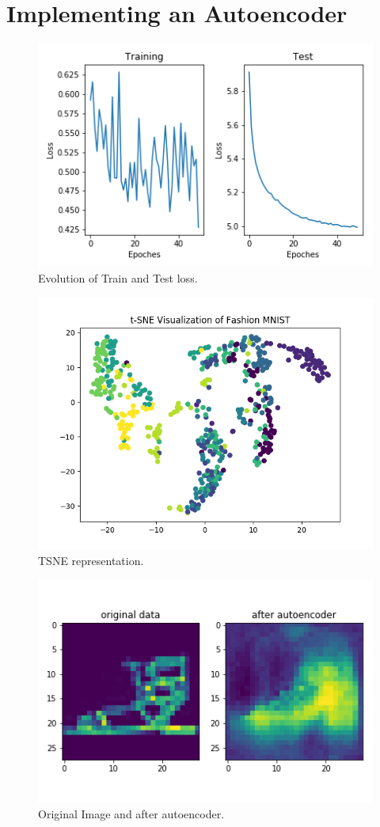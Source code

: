 \documentclass[11pt,a4paper,oneside]{article}
\begin{document}
\section{Implementing an Autoencoder}
\begin{figure}
	\centering
	\includegraphics[width=.9\textwidth]{figures/auto_encoder_evolution}
	\caption{Evolution of Train and Test loss.}
\end{figure}
\begin{figure}[!btp]
	\centering
	\includegraphics[width=.9\textwidth]{figures/t_sne}
	\caption{TSNE representation.}
\end{figure}
\begin{figure}[!btp]
	\centering
	\includegraphics[width=.6\textwidth]{figures/save_ev_0}
	\caption{Original Image and after autoencoder.}
\end{figure}
\end{document}
